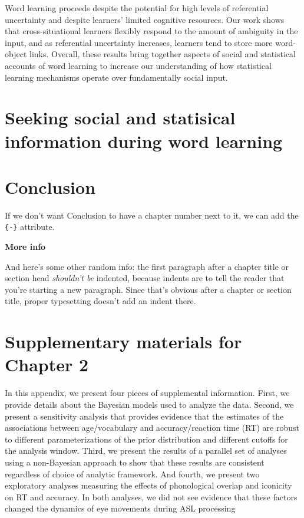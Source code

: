 \documentclass[oneside]{report}
\begin{document}
Word learning proceeds despite the potential for high levels of
referential uncertainty and despite learners' limited cognitive
resources. Our work shows that cross-situational learners flexibly
respond to the amount of ambiguity in the input, and as referential
uncertainty increases, learners tend to store more word-object links.
Overall, these results bring together aspects of social and statistical
accounts of word learning to increase our understanding of how
statistical learning mechanisms operate over fundamentally social input.

\hypertarget{speed-nov}{%
\chapter{Seeking social and statisical information during word
learning}\label{speed-nov}}

\hypertarget{conclusion}{%
\chapter*{Conclusion}\label{conclusion}}

If we don't want Conclusion to have a chapter number next to it, we can
add the \texttt{\{-\}} attribute.

\textbf{More info}

And here's some other random info: the first paragraph after a chapter
title or section head \emph{shouldn't be} indented, because indents are
to tell the reader that you're starting a new paragraph. Since that's
obvious after a chapter or section title, proper typesetting doesn't add
an indent there.

\appendix

\hypertarget{supplementary-materials-for-chapter-2}{%
\chapter{Supplementary materials for Chapter
2}\label{supplementary-materials-for-chapter-2}}

In this appendix, we present four pieces of supplemental information.
First, we provide details about the Bayesian models used to analyze the
data. Second, we present a sensitivity analysis that provides evidence
that the estimates of the associations between age/vocabulary and
accuracy/reaction time (RT) are robust to different parameterizations of
the prior distribution and different cutoffs for the analysis window.
Third, we present the results of a parallel set of analyses using a
non-Bayesian approach to show that these results are consistent
regardless of choice of analytic framework. And fourth, we present two
exploratory analyses measuring the effects of phonological overlap and
iconicity on RT and accuracy. In both analyses, we did not see evidence
that these factors changed the dynamics of eye movements during ASL
processing
\end{document}
